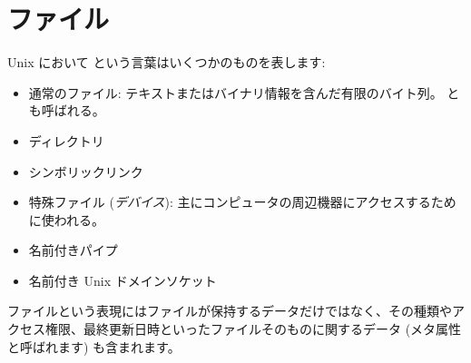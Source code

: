 %
%

\chapter{\label{sec/files}ファイル}

Unix において  という言葉はいくつかのものを表します:
%
\begin{itemize}
\item 通常のファイル: テキストまたはバイナリ情報を含んだ有限のバイト列。  とも呼ばれる。
%
\item ディレクトリ
%
\item シンボリックリンク
%
\item 特殊ファイル (\emph{デバイス}): 主にコンピュータの周辺機器にアクセスするために使われる。
%
\item 名前付きパイプ
%
\item 名前付き Unix ドメインソケット
\end{itemize}
%
ファイルという表現にはファイルが保持するデータだけではなく、その種類やアクセス権限、最終更新日時といったファイルそのものに関するデータ (メタ属性と呼ばれます) も含まれます。


